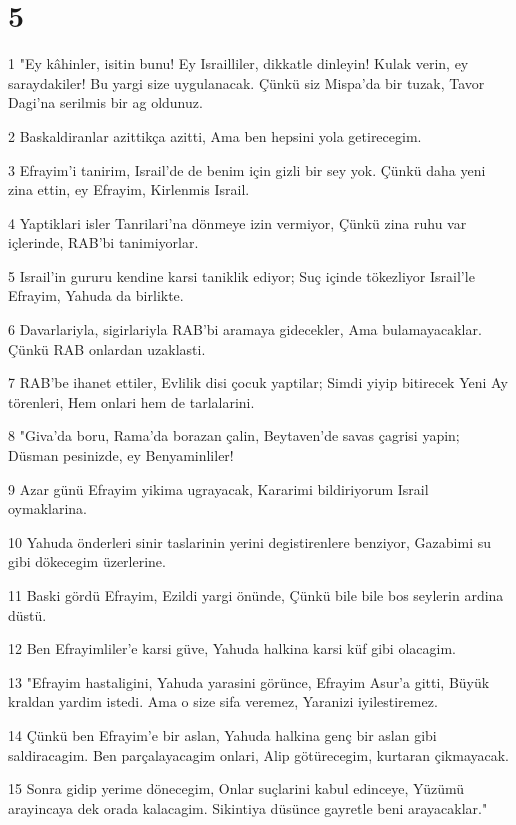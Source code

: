 \chapter{5}

\par 1 "Ey kâhinler, isitin bunu! Ey Israilliler, dikkatle dinleyin! Kulak verin, ey saraydakiler! Bu yargi size uygulanacak. Çünkü siz Mispa'da bir tuzak, Tavor Dagi'na serilmis bir ag oldunuz.
\par 2 Baskaldiranlar azittikça azitti, Ama ben hepsini yola getirecegim.
\par 3 Efrayim'i tanirim, Israil'de de benim için gizli bir sey yok. Çünkü daha yeni zina ettin, ey Efrayim, Kirlenmis Israil.
\par 4 Yaptiklari isler Tanrilari'na dönmeye izin vermiyor, Çünkü zina ruhu var içlerinde, RAB'bi tanimiyorlar.
\par 5 Israil'in gururu kendine karsi taniklik ediyor; Suç içinde tökezliyor Israil'le Efrayim, Yahuda da birlikte.
\par 6 Davarlariyla, sigirlariyla RAB'bi aramaya gidecekler, Ama bulamayacaklar. Çünkü RAB onlardan uzaklasti.
\par 7 RAB'be ihanet ettiler, Evlilik disi çocuk yaptilar; Simdi yiyip bitirecek Yeni Ay törenleri, Hem onlari hem de tarlalarini.
\par 8 "Giva'da boru, Rama'da borazan çalin, Beytaven'de savas çagrisi yapin; Düsman pesinizde, ey Benyaminliler!
\par 9 Azar günü Efrayim yikima ugrayacak, Kararimi bildiriyorum Israil oymaklarina.
\par 10 Yahuda önderleri sinir taslarinin yerini degistirenlere benziyor, Gazabimi su gibi dökecegim üzerlerine.
\par 11 Baski gördü Efrayim, Ezildi yargi önünde, Çünkü bile bile bos seylerin ardina düstü.
\par 12 Ben Efrayimliler'e karsi güve, Yahuda halkina karsi küf gibi olacagim.
\par 13 "Efrayim hastaligini, Yahuda yarasini görünce, Efrayim Asur'a gitti, Büyük kraldan yardim istedi. Ama o size sifa veremez, Yaranizi iyilestiremez.
\par 14 Çünkü ben Efrayim'e bir aslan, Yahuda halkina genç bir aslan gibi saldiracagim. Ben parçalayacagim onlari, Alip götürecegim, kurtaran çikmayacak.
\par 15 Sonra gidip yerime dönecegim, Onlar suçlarini kabul edinceye, Yüzümü arayincaya dek orada kalacagim. Sikintiya düsünce gayretle beni arayacaklar."

